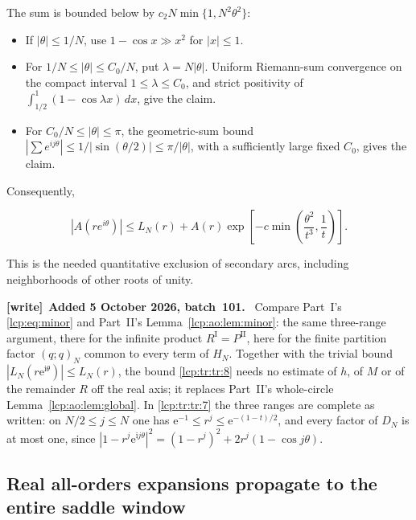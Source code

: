\documentclass[11pt]{article}
\numberwithin{equation}{section}
\theoremstyle{definition}\newtheorem{definition}[theorem]{Definition}
\theoremstyle{remark}\newtheorem{remark}[theorem]{Remark}
\newcommand{\ee}{\mathrm e}
\newcommand{\ii}{\mathrm i}%
\newenvironment{writenote}[1][]{\par\smallskip\begingroup\small
 \noindent\textbf{[write]}\if\relax\detokenize{#1}\relax\else~\textbf{#1.}\fi\ }%
 {\par\endgroup\smallskip}
\begin{document}
The sum is bounded below by \(c_2N\min\{1,N^2\theta^2\}\):

\begin{itemize}[itemsep=0pt]
\item
  If \(|\theta|\le1/N\), use \(1-\cos x\gg x^2\) for \(|x|\le1\).
\item
  For \(1/N\le|\theta|\le C_0/N\), put \(\lambda=N|\theta|\). Uniform
  Riemann-sum convergence on the compact interval
  \(1\le\lambda\le C_0\), and strict positivity of
  \(\int_{1/2}^1(1-\cos\lambda x)\,dx\), give the claim.
\item
  For \(C_0/N\le|\theta|\le\pi\), the geometric-sum bound
  \(|\sum e^{ij\theta}|\le1/|\sin(\theta/2)|\le\pi/|\theta|\), with a
  sufficiently large fixed \(C_0\), gives the claim.
\end{itemize}

Consequently,

\begin{equation}\label{lcp:tr:tr:8}
|A(re^{i\theta})|\le L_N(r)+A(r)\exp\left[-c\min\left(\frac{\theta^2}{t^3},\frac1t\right)\right].
\end{equation}

This is the needed quantitative exclusion of secondary arcs, including
neighborhoods of other roots of unity.

\begin{writenote}[Added 5 October 2026, batch~101]
Compare Part~I's \eqref{lcp:eq:minor} and Part~II's
Lemma~\ref{lcp:ao:lem:minor}: the same three-range argument, there for the
infinite product $R^{\mathrm I}=P^{\mathrm{II}}$, here for the finite
partition factor $(q;q)_N$ common to every term of $H_N$. Together with
the trivial bound $|L_N(r\ee^{\ii\theta})|\le L_N(r)$, the bound
\eqref{lcp:tr:tr:8} needs no estimate of $h$, of $M$ or of the remainder
$R$ off the real axis; it replaces Part~II's whole-circle
Lemma~\ref{lcp:ao:lem:global}. In \eqref{lcp:tr:tr:7} the three ranges are
complete as written: on $N/2\le j\le N$ one has $\ee^{-1}\le r^j\le
\ee^{-(1-t)/2}$, and every factor of $D_N$ is at most one, since
$|1-r^j\ee^{\ii j\theta}|^2=(1-r^j)^2+2r^j(1-\cos j\theta)$.
\end{writenote}


\subsection{Real all-orders expansions propagate to the entire saddle
window}\label{lcp:tr:real-all-orders-expansions-propagate-to-the-entire-saddle-window}
\end{document}
